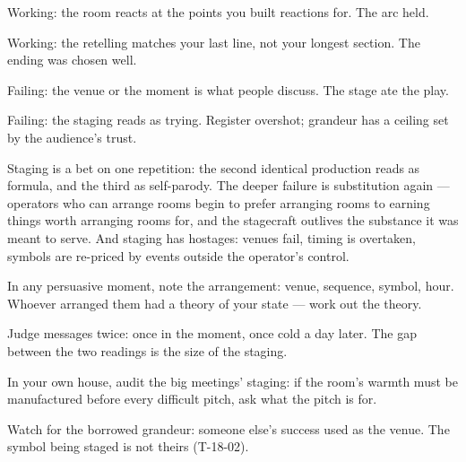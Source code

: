 \begin{feedback}
  \item Working: the room reacts at the points you built reactions for. The arc held.
  \item Working: the retelling matches your last line, not your longest section. The ending was chosen well.
  \item Failing: the venue or the moment is what people discuss. The stage ate the play.
  \item Failing: the staging reads as trying. Register overshot; grandeur has a ceiling set by the audience's trust.
\end{feedback}
\begin{failure}
Staging is a bet on one repetition: the second identical production reads as formula, and the third as self-parody. The deeper failure is substitution again --- operators who can arrange rooms begin to prefer arranging rooms to earning things worth arranging rooms for, and the stagecraft outlives the substance it was meant to serve. And staging has hostages: venues fail, timing is overtaken, symbols are re-priced by events outside the operator's control.
\end{failure}
\begin{countermeasures}
  \item In any persuasive moment, note the arrangement: venue, sequence, symbol, hour. Whoever arranged them had a theory of your state --- work out the theory.
  \item Judge messages twice: once in the moment, once cold a day later. The gap between the two readings is the size of the staging.
  \item In your own house, audit the big meetings' staging: if the room's warmth must be manufactured before every difficult pitch, ask what the pitch is for.
  \item Watch for the borrowed grandeur: someone else's success used as the venue. The symbol being staged is not theirs (T-18-02).
\end{countermeasures}

\seesources
{}
